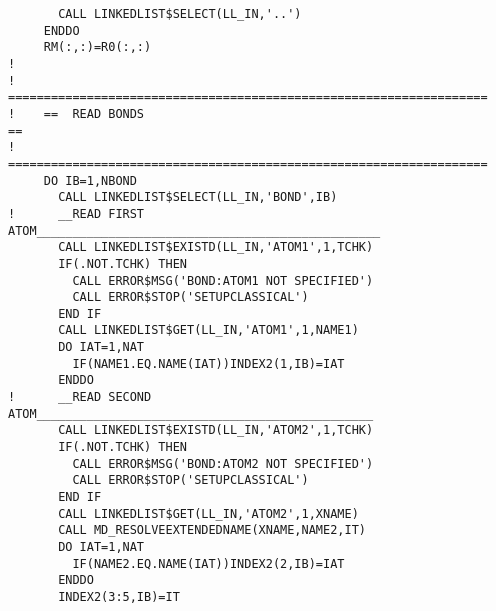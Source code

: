 \documentclass[11pt,a4paper]{report}
\begin{document}
\begin{verbatim}
       CALL LINKEDLIST$SELECT(LL_IN,'..')
     ENDDO
     RM(:,:)=R0(:,:)
!
!    ===================================================================
!    ==  READ BONDS                                                   ==
!    ===================================================================
     DO IB=1,NBOND
       CALL LINKEDLIST$SELECT(LL_IN,'BOND',IB)
!      __READ FIRST ATOM________________________________________________
       CALL LINKEDLIST$EXISTD(LL_IN,'ATOM1',1,TCHK)
       IF(.NOT.TCHK) THEN
         CALL ERROR$MSG('BOND:ATOM1 NOT SPECIFIED')
         CALL ERROR$STOP('SETUPCLASSICAL')
       END IF
       CALL LINKEDLIST$GET(LL_IN,'ATOM1',1,NAME1)
       DO IAT=1,NAT
         IF(NAME1.EQ.NAME(IAT))INDEX2(1,IB)=IAT
       ENDDO
!      __READ SECOND ATOM_______________________________________________
       CALL LINKEDLIST$EXISTD(LL_IN,'ATOM2',1,TCHK)
       IF(.NOT.TCHK) THEN
         CALL ERROR$MSG('BOND:ATOM2 NOT SPECIFIED')
         CALL ERROR$STOP('SETUPCLASSICAL')
       END IF
       CALL LINKEDLIST$GET(LL_IN,'ATOM2',1,XNAME)
       CALL MD_RESOLVEEXTENDEDNAME(XNAME,NAME2,IT)
       DO IAT=1,NAT
         IF(NAME2.EQ.NAME(IAT))INDEX2(2,IB)=IAT
       ENDDO
       INDEX2(3:5,IB)=IT 


\end{verbatim}
\end{document}
